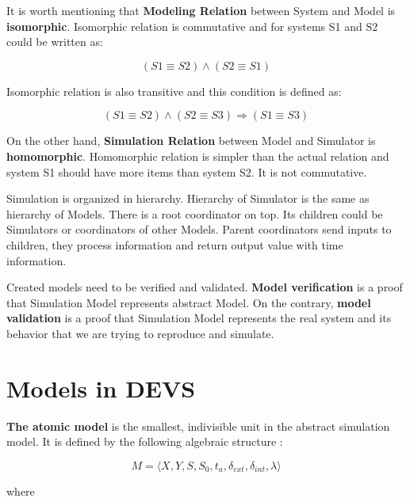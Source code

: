 \documentclass[fleqn,10pt]{olplainarticle}
\begin{document}
\pagebreak

\noindent It is worth mentioning that \textbf{Modeling Relation} between System and Model is \textbf{isomorphic}. Isomorphic relation is commutative and for systems S1 and S2 could be written as:

$$(S1 \equiv S2) \land (S2 \equiv S1)$$

\noindent Isomorphic relation is also transitive and this condition is defined as:

$$(S1 \equiv S2) \land (S2 \equiv S3) \Rightarrow (S1 \equiv S3)$$

\vskip10pt

On the other hand, \textbf{Simulation Relation} between Model and Simulator is \textbf{homomorphic}. Homomorphic relation is simpler than the actual relation and system S1 should have more items than system S2. It is not commutative.

\vskip10pt

Simulation is organized in hierarchy. Hierarchy of Simulator is the same as hierarchy of Models. There is a root coordinator on top. Its children could be Simulators or coordinators of other Models. Parent coordinators send inputs to children, they process information and return output value with time information.

\vskip10pt

Created models need to be verified and validated. \textbf{Model verification} is a proof that Simulation Model represents abstract Model. On the contrary, \textbf{model validation} is a proof that Simulation Model represents the real system and its behavior that we are trying to reproduce and simulate.

\section{Models in DEVS}

\textbf{The atomic model} is the smallest, indivisible unit in the abstract simulation model. It is defined by the following algebraic structure \cite{DEVSformalism}:

$$M = \langle X, Y, S, S_0, t_a, \delta_{ext}, \delta_{int}, \lambda \rangle$$

\noindent where
\end{document}
